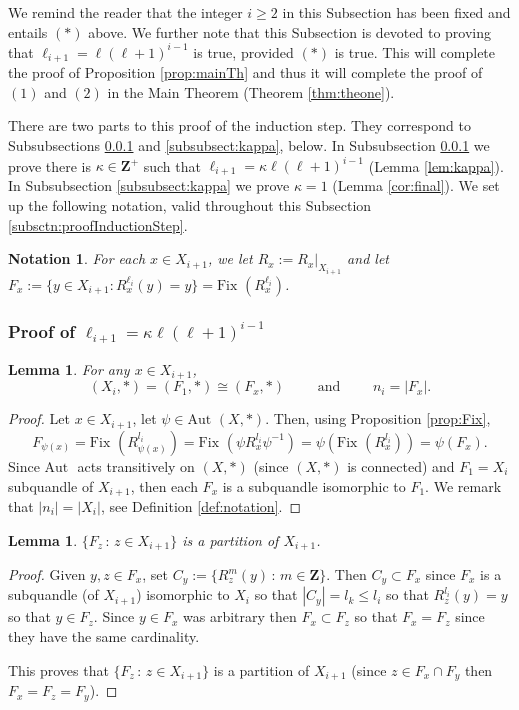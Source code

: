 \documentclass{article}
\newtheorem{lemma}[theorem]{Lemma}
\newtheorem{notation}[theorem]{Notation}
\begin{document}
We remind the reader that the integer $i\geq 2$ in this Subsection has been fixed and entails $(*)$ above. We further note that this Subsection is devoted to proving that $\ell_{i+1}=\ell(\ell+1)^{i-1}$ is true, provided $(*)$ is true. This will complete the proof of Proposition \ref{prop:mainTh} and thus it will complete the proof of $(1)$ and $(2)$ in the Main Theorem (Theorem \ref{thm:theone}).


There are two parts to this proof of the induction step. They correspond to Subsubsections \ref{subsubsect:li+1dividedby} and  \ref{subsubsect:kappa},  below. In Subsubsection \ref{subsubsect:li+1dividedby} we prove
there is $\kappa\in \mathbf{Z}^+$ such that $\ell_{i+1}=\kappa\ell (\ell +1)^{i-1}$ (Lemma \ref{lem:kappa}). In Subsubsection \ref{subsubsect:kappa} we prove $\kappa = 1$ (Lemma \ref{cor:final}).
\bigbreak
We set up the following notation, valid  throughout this Subsection \ref{subsctn:proofInductionStep}.
\bigbreak




\begin{notation}
For each $x\in X_{i+1}$, we let $R_x:=R_x\vert_{X_{i+1}}$ and let $F_x:=\{y\in X_{i+1}:R_x^{\ell_i}(y)=y\}=\text{Fix }(R_x^{\ell_i})$.
\end{notation}


\subsubsection{Proof of $\ell_{i+1}=\kappa \ell (\ell+1)^{i-1}$}\label{subsubsect:li+1dividedby}

\begin{lemma}\label{lem:Fxiso}
For any $x\in X_{i+1}$,
$$(X_i, *) = (F_1, *) \cong (F_x, *)\qquad \text{ and } \qquad n_i=|F_x| .$$
\end{lemma}
\begin{proof}
Let $x\in X_{i+1}$, let $\psi\in \text{Aut }(X, *)$. Then, using Proposition \ref{prop:Fix}, $$F_{\psi(x)}=\text{Fix }(R_{\psi(x)}^{l_i})=\text{Fix }(\psi R_{x}^{l_i}\psi^{-1})=\psi (\text{Fix }(R_{x}^{l_i}))=\psi(F_x) .$$Since $\text{Aut }$ acts transitively on $(X, *)$ (since $(X, *)$ is connected) and $F_1=X_i$ subquandle of $X_{i+1}$, then each $F_x$ is a subquandle isomorphic to $F_1$. We remark that $|n_i|=|X_i|$, see Definition \ref{def:notation}.
\end{proof}
\begin{lemma}\label{lem:Fxpartition}
$\{ F_z \,:\, z\in X_{i+1} \}$ is a partition of $X_{i+1}$.
\end{lemma}
\begin{proof}
Given $y, z\in F_x$, set $C_y:=\{ R_z^m(y)\,:\, m\in \mathbf{Z}\}$. Then $C_y\subset F_x$ since $F_x$ is a subquandle (of $X_{i+1}$) isomorphic to $X_i$ so that $|C_y|=l_k\leq l_i$ so that $R_z^{l_i}(y)=y$ so that $y\in F_z$. Since $y\in F_x$ was arbitrary then $F_x\subset F_z$ so that $F_x=F_z$ since they have the same cardinality.



This proves that $\{ F_z\, : \, z\in X_{i+1}\}$ is a partition of $X_{i+1}$ (since $z\in F_x \cap F_y$ then $F_x=F_z=F_y$).
\end{proof}
\end{document}
